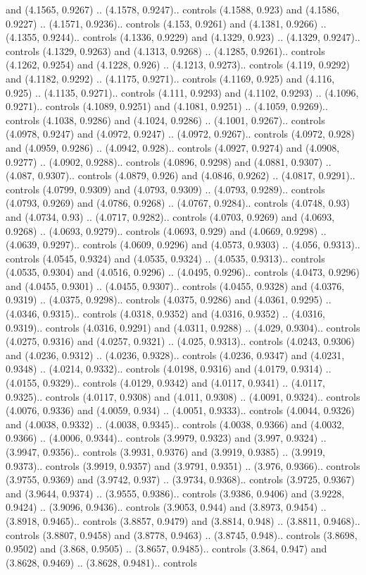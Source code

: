and (4.1565, 0.9267) .. (4.1578, 0.9247).. controls (4.1588, 0.923) and (4.1586, 0.9227) .. (4.1571, 0.9236).. controls (4.153, 0.9261) and (4.1381, 0.9266) .. (4.1355, 0.9244).. controls (4.1336, 0.9229) and (4.1329, 0.923) .. (4.1329, 0.9247).. controls (4.1329, 0.9263) and (4.1313, 0.9268) .. (4.1285, 0.9261).. controls (4.1262, 0.9254) and (4.1228, 0.926) .. (4.1213, 0.9273).. controls (4.119, 0.9292) and (4.1182, 0.9292) .. (4.1175, 0.9271).. controls (4.1169, 0.925) and (4.116, 0.925) .. (4.1135, 0.9271).. controls (4.111, 0.9293) and (4.1102, 0.9293) .. (4.1096, 0.9271).. controls (4.1089, 0.9251) and (4.1081, 0.9251) .. (4.1059, 0.9269).. controls (4.1038, 0.9286) and (4.1024, 0.9286) .. (4.1001, 0.9267).. controls (4.0978, 0.9247) and (4.0972, 0.9247) .. (4.0972, 0.9267).. controls (4.0972, 0.928) and (4.0959, 0.9286) .. (4.0942, 0.928).. controls (4.0927, 0.9274) and (4.0908, 0.9277) .. (4.0902, 0.9288).. controls (4.0896, 0.9298) and (4.0881, 0.9307) .. (4.087, 0.9307).. controls (4.0879, 0.926) and (4.0846, 0.9262) .. (4.0817, 0.9291).. controls (4.0799, 0.9309) and (4.0793, 0.9309) .. (4.0793, 0.9289).. controls (4.0793, 0.9269) and (4.0786, 0.9268) .. (4.0767, 0.9284).. controls (4.0748, 0.93) and (4.0734, 0.93) .. (4.0717, 0.9282).. controls (4.0703, 0.9269) and (4.0693, 0.9268) .. (4.0693, 0.9279).. controls (4.0693, 0.929) and (4.0669, 0.9298) .. (4.0639, 0.9297).. controls (4.0609, 0.9296) and (4.0573, 0.9303) .. (4.056, 0.9313).. controls (4.0545, 0.9324) and (4.0535, 0.9324) .. (4.0535, 0.9313).. controls (4.0535, 0.9304) and (4.0516, 0.9296) .. (4.0495, 0.9296).. controls (4.0473, 0.9296) and (4.0455, 0.9301) .. (4.0455, 0.9307).. controls (4.0455, 0.9328) and (4.0376, 0.9319) .. (4.0375, 0.9298).. controls (4.0375, 0.9286) and (4.0361, 0.9295) .. (4.0346, 0.9315).. controls (4.0318, 0.9352) and (4.0316, 0.9352) .. (4.0316, 0.9319).. controls (4.0316, 0.9291) and (4.0311, 0.9288) .. (4.029, 0.9304).. controls (4.0275, 0.9316) and (4.0257, 0.9321) .. (4.025, 0.9313).. controls (4.0243, 0.9306) and (4.0236, 0.9312) .. (4.0236, 0.9328).. controls (4.0236, 0.9347) and (4.0231, 0.9348) .. (4.0214, 0.9332).. controls (4.0198, 0.9316) and (4.0179, 0.9314) .. (4.0155, 0.9329).. controls (4.0129, 0.9342) and (4.0117, 0.9341) .. (4.0117, 0.9325).. controls (4.0117, 0.9308) and (4.011, 0.9308) .. (4.0091, 0.9324).. controls (4.0076, 0.9336) and (4.0059, 0.934) .. (4.0051, 0.9333).. controls (4.0044, 0.9326) and (4.0038, 0.9332) .. (4.0038, 0.9345).. controls (4.0038, 0.9366) and (4.0032, 0.9366) .. (4.0006, 0.9344).. controls (3.9979, 0.9323) and (3.997, 0.9324) .. (3.9947, 0.9356).. controls (3.9931, 0.9376) and (3.9919, 0.9385) .. (3.9919, 0.9373).. controls (3.9919, 0.9357) and (3.9791, 0.9351) .. (3.976, 0.9366).. controls (3.9755, 0.9369) and (3.9742, 0.937) .. (3.9734, 0.9368).. controls (3.9725, 0.9367) and (3.9644, 0.9374) .. (3.9555, 0.9386).. controls (3.9386, 0.9406) and (3.9228, 0.9424) .. (3.9096, 0.9436).. controls (3.9053, 0.944) and (3.8973, 0.9454) .. (3.8918, 0.9465).. controls (3.8857, 0.9479) and (3.8814, 0.948) .. (3.8811, 0.9468).. controls (3.8807, 0.9458) and (3.8778, 0.9463) .. (3.8745, 0.948).. controls (3.8698, 0.9502) and (3.868, 0.9505) .. (3.8657, 0.9485).. controls (3.864, 0.947) and (3.8628, 0.9469) .. (3.8628, 0.9481).. controls 